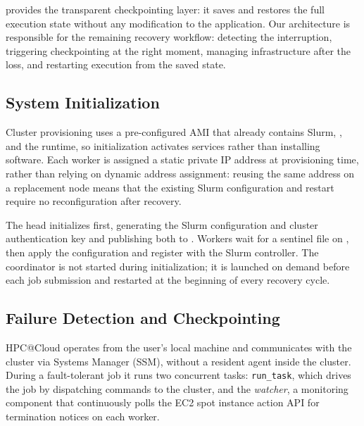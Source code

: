 \documentclass[conference]{IEEEtran}
\begin{document}
\MANA provides the transparent checkpointing layer: it saves and restores the full \MPI
execution state without any modification to the application.
Our architecture is responsible for the remaining recovery workflow: detecting the
interruption, triggering checkpointing at the right moment, managing infrastructure
after the loss, and restarting execution from the saved state.

\subsection{System Initialization}
\label{sec:init}

Cluster provisioning uses a pre-configured AMI that already contains Slurm, \MANA, and
the \MPI runtime, so initialization activates services rather than installing software.
Each worker is assigned a static private IP address at provisioning time, rather than
relying on dynamic address assignment: reusing the same address on a replacement node
means that the existing Slurm configuration and \MANA restart require no reconfiguration
after recovery.

The head initializes first, generating the Slurm configuration and cluster
authentication key and publishing both to \EFS.
Workers wait for a sentinel file on \EFS, then apply the configuration and register
with the Slurm controller.
The \MANA coordinator is not started during initialization; it is launched on demand
before each job submission and restarted at the beginning of every recovery cycle.

\subsection{Failure Detection and Checkpointing}
\label{sec:detection}

HPC@Cloud operates from the user's local machine and communicates with the cluster via
\AWS Systems Manager (SSM), without a resident agent inside the cluster.
During a fault-tolerant job it runs two concurrent tasks: \texttt{run\_task}, which
drives the job by dispatching commands to the cluster, and the \emph{watcher}, a
monitoring component that continuously polls the EC2 spot instance action API for
termination notices on each worker.
\end{document}

